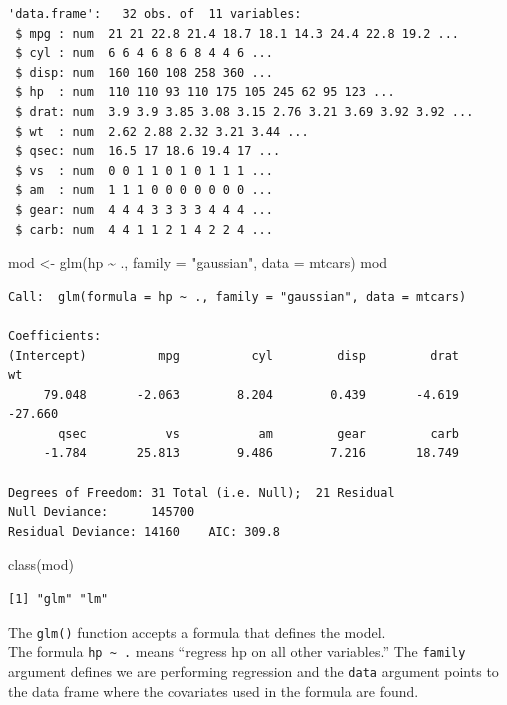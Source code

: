 \documentclass[
]{book}
\newenvironment{Shaded}{\begin{snugshade}}{\end{snugshade}}
\newcommand{\AttributeTok}[1]{\textcolor[rgb]{0.77,0.63,0.00}{#1}}
\newcommand{\FunctionTok}[1]{\textcolor[rgb]{0.00,0.00,0.00}{#1}}
\newcommand{\NormalTok}[1]{#1}
\newcommand{\OtherTok}[1]{\textcolor[rgb]{0.56,0.35,0.01}{#1}}
\newcommand{\SpecialCharTok}[1]{\textcolor[rgb]{0.00,0.00,0.00}{#1}}
\newcommand{\StringTok}[1]{\textcolor[rgb]{0.31,0.60,0.02}{#1}}
\begin{document}
\begin{verbatim}
'data.frame':   32 obs. of  11 variables:
 $ mpg : num  21 21 22.8 21.4 18.7 18.1 14.3 24.4 22.8 19.2 ...
 $ cyl : num  6 6 4 6 8 6 8 4 4 6 ...
 $ disp: num  160 160 108 258 360 ...
 $ hp  : num  110 110 93 110 175 105 245 62 95 123 ...
 $ drat: num  3.9 3.9 3.85 3.08 3.15 2.76 3.21 3.69 3.92 3.92 ...
 $ wt  : num  2.62 2.88 2.32 3.21 3.44 ...
 $ qsec: num  16.5 17 18.6 19.4 17 ...
 $ vs  : num  0 0 1 1 0 1 0 1 1 1 ...
 $ am  : num  1 1 1 0 0 0 0 0 0 0 ...
 $ gear: num  4 4 4 3 3 3 3 4 4 4 ...
 $ carb: num  4 4 1 1 2 1 4 2 2 4 ...
\end{verbatim}

\begin{Shaded}
\begin{Highlighting}[]
\NormalTok{mod }\OtherTok{\textless{}{-}} \FunctionTok{glm}\NormalTok{(hp }\SpecialCharTok{\textasciitilde{}}\NormalTok{ ., }\AttributeTok{family =} \StringTok{"gaussian"}\NormalTok{, }\AttributeTok{data =}\NormalTok{ mtcars)}
\NormalTok{mod}
\end{Highlighting}
\end{Shaded}

\begin{verbatim}
Call:  glm(formula = hp ~ ., family = "gaussian", data = mtcars)

Coefficients:
(Intercept)          mpg          cyl         disp         drat           wt  
     79.048       -2.063        8.204        0.439       -4.619      -27.660  
       qsec           vs           am         gear         carb  
     -1.784       25.813        9.486        7.216       18.749  

Degrees of Freedom: 31 Total (i.e. Null);  21 Residual
Null Deviance:      145700 
Residual Deviance: 14160    AIC: 309.8
\end{verbatim}

\begin{Shaded}
\begin{Highlighting}[]
\FunctionTok{class}\NormalTok{(mod)}
\end{Highlighting}
\end{Shaded}

\begin{verbatim}
[1] "glm" "lm" 
\end{verbatim}

The \texttt{glm()} function accepts a formula that defines the model.\\
The formula \texttt{hp\ \textasciitilde{}\ .} means ``regress hp on all other variables.'' The \texttt{family} argument defines we are performing regression and the \texttt{data} argument points to the data frame where the covariates used in the formula are found.
\end{document}
